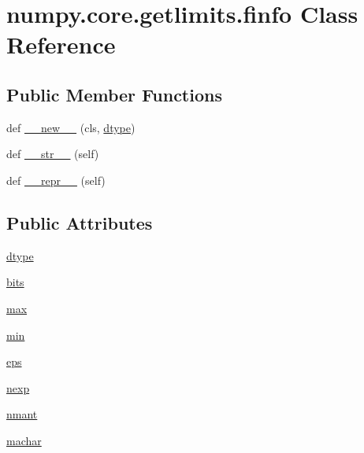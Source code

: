 \hypertarget{classnumpy_1_1core_1_1getlimits_1_1finfo}{}\section{numpy.\+core.\+getlimits.\+finfo Class Reference}
\label{classnumpy_1_1core_1_1getlimits_1_1finfo}
\subsection*{Public Member Functions}
\begin{DoxyCompactItemize}
\item 
def \hyperlink{classnumpy_1_1core_1_1getlimits_1_1finfo_acd380768bde6ef5287567498f9861dd4}{\+\_\+\+\_\+new\+\_\+\+\_\+} (cls, \hyperlink{classnumpy_1_1core_1_1getlimits_1_1finfo_aa753c1463bfcd4726e8483b68e685cc5}{dtype})
\item 
def \hyperlink{classnumpy_1_1core_1_1getlimits_1_1finfo_abdce9237352c81d82cd1bb113b3079d4}{\+\_\+\+\_\+str\+\_\+\+\_\+} (self)
\item 
def \hyperlink{classnumpy_1_1core_1_1getlimits_1_1finfo_aff63cb930aa0fbbb6f2a5dc3cc81d37c}{\+\_\+\+\_\+repr\+\_\+\+\_\+} (self)
\end{DoxyCompactItemize}
\subsection*{Public Attributes}
\begin{DoxyCompactItemize}
\item 
\hyperlink{classnumpy_1_1core_1_1getlimits_1_1finfo_aa753c1463bfcd4726e8483b68e685cc5}{dtype}
\item 
\hyperlink{classnumpy_1_1core_1_1getlimits_1_1finfo_a20640ad67b853dafcae71b4a15720f55}{bits}
\item 
\hyperlink{classnumpy_1_1core_1_1getlimits_1_1finfo_a47376ce64d9825d3c124e59e3fe6a2e0}{max}
\item 
\hyperlink{classnumpy_1_1core_1_1getlimits_1_1finfo_a557c0a91922946da84851995cb1f5c0e}{min}
\item 
\hyperlink{classnumpy_1_1core_1_1getlimits_1_1finfo_a72472bbc3cd2e13995e86b81c3591671}{eps}
\item 
\hyperlink{classnumpy_1_1core_1_1getlimits_1_1finfo_a3c4edd130a3f479fde74f3c977c66c52}{nexp}
\item 
\hyperlink{classnumpy_1_1core_1_1getlimits_1_1finfo_a54e7dfdcefe800d92984f9c281cf2ccb}{nmant}
\item 
\hyperlink{classnumpy_1_1core_1_1getlimits_1_1finfo_ae97135be40a18278b50dc9a2281546d9}{machar}
\end{DoxyCompactItemize}


